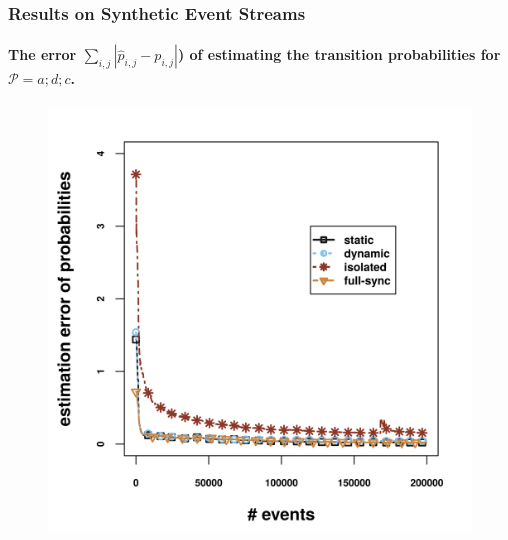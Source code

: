 \begin{frame}
	
	\frametitle{Results on Synthetic Event Streams }
	\framesubtitle{The error  $\sum_{i,j} |\hat{p}_{i,j} - {p}_{i,j}|$) of estimating the transition probabilities  for $\mathcal{P}=a;d;c$.}
	
	\begin{figure}[H]
		\centering
		\includegraphics[width=.9\textwidth,height=.8\textheight]{../chapters/figures/synthetic/new/error_synthetic.png}
		
	\end{figure}
	
\end{frame}


